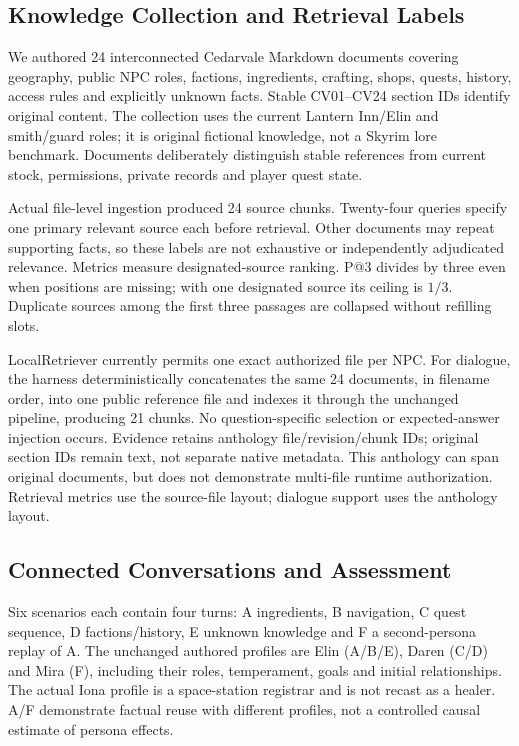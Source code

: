 \documentclass[conference]{IEEEtran}
\begin{document}
\subsection{Knowledge Collection and Retrieval Labels}
We authored 24 interconnected Cedarvale Markdown documents covering geography, public NPC roles, factions, ingredients, crafting, shops, quests, history, access rules and explicitly unknown facts. Stable CV01--CV24 section IDs identify original content. The collection uses the current Lantern Inn/Elin and smith/guard roles; it is original fictional knowledge, not a Skyrim lore benchmark. Documents deliberately distinguish stable references from current stock, permissions, private records and player quest state.

Actual file-level ingestion produced 24 source chunks. Twenty-four queries specify one primary relevant source each before retrieval. Other documents may repeat supporting facts, so these labels are not exhaustive or independently adjudicated relevance. Metrics measure designated-source ranking. P@3 divides by three even when positions are missing; with one designated source its ceiling is $1/3$. Duplicate sources among the first three passages are collapsed without refilling slots.

LocalRetriever currently permits one exact authorized file per NPC. For dialogue, the harness deterministically concatenates the same 24 documents, in filename order, into one public reference file and indexes it through the unchanged pipeline, producing 21 chunks. No question-specific selection or expected-answer injection occurs. Evidence retains anthology file/revision/chunk IDs; original section IDs remain text, not separate native metadata. This anthology can span original documents, but does not demonstrate multi-file runtime authorization. Retrieval metrics use the source-file layout; dialogue support uses the anthology layout.

\subsection{Connected Conversations and Assessment}
Six scenarios each contain four turns: A ingredients, B navigation, C quest sequence, D factions/history, E unknown knowledge and F a second-persona replay of A. The unchanged authored profiles are Elin (A/B/E), Daren (C/D) and Mira (F), including their roles, temperament, goals and initial relationships. The actual Iona profile is a space-station registrar and is not recast as a healer. A/F demonstrate factual reuse with different profiles, not a controlled causal estimate of persona effects.
\end{document}
